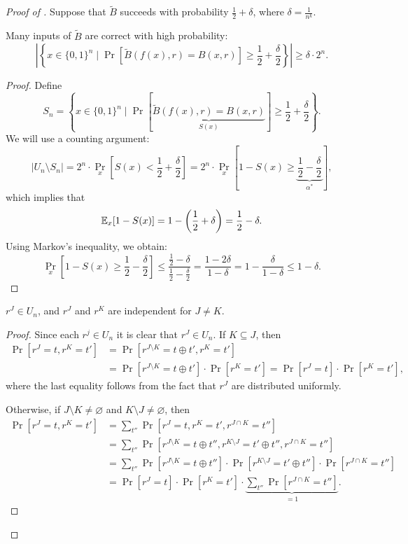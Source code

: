 \begin{proof}[Proof of ]
    Suppose that $\tilde{B}$ succeeds with probability $\frac{1}{2} + \delta$, where $\delta = \frac{1}{n^{k}}$.

	\begin{lemma}
		Many inputs of $\tilde{B}$ are correct with high probability:
		 \[
			 \left|\left\{x \in \{0,1\}^n \mid \Pr[\tilde{B}(f(x), r) = B(x, r)] \geq \frac{1}{2} + \frac{\delta}{2}\right\}\right| \geq \delta \cdot 2^n.
		\] 
	\end{lemma}

	\begin{proof}
		  Define 
		  \[
			  S_n = \left\{x \in \{0,1\}^n \mid \Pr\left[\underbrace{\tilde{B}(f(x), r) = B(x, r)}_{S(x)}\right] \geq \frac{1}{2} + \frac{\delta}{2}\right\}.
		  \] 
		  We will use a counting argument:
		\[
			|U_n \setminus S_n| = 2^{n} \cdot \Pr_x \left[S(x) < \frac{1}{2} + \frac{\delta}{2}\right] = 2^{n} \cdot \Pr_x \left[1 - S(x) \geq \underbrace{\frac{1}{2} - \frac{\delta}{2}}_{\alpha^*}\right],
		\] 
		which implies that
		\[
			\mathbb{E}_x[1 - S(x)] = 1 - \left(\frac{1}{2} + \delta\right) = \frac{1}{2} - \delta.
		\] 
		Using Markov's inequality, we obtain:
		\[
			\Pr_x \left[1 - S(x) \geq \frac{1}{2} - \frac{\delta}{2}\right] \leq \frac{\frac{1}{2} - \delta}{\frac{1}{2} - \frac{\delta}{2}} = \frac{1 - 2 \delta}{1 - \delta} = 1 - \frac{\delta}{1 - \delta} \leq 1 - \delta.
		\] 
	\end{proof}

	\begin{lemma}
		$r^J \in U_n$, and $r^J$ and $r^K$ are independent for $J \neq K$.
	\end{lemma}

	\begin{proof}
		Since each $r^{j} \in  U_n$ it is clear that $r^{J} \in  U_n$.
		If $K \subseteq J$, then
		 \begin{align*}
			 \Pr[r^J = t, r^K = t'] &= \Pr[r^{J \setminus K} = t \oplus t', r^{K} = t'] \\
									&= \Pr[r^{J \setminus K} = t \oplus t'] \cdot \Pr[r^K = t'] = \Pr[r^J = t] \cdot \Pr[r^K = t'],
		 \end{align*} 
		 where the last equality follows from the fact that $r^J$ are distributed uniformly. 

		 Otherwise, if $J \setminus K \neq \varnothing$ and $K \setminus J \neq \varnothing$, then
		 \begin{align*}
			 \Pr[r^J = t, r^K = t'] &= \sum_{t''} \Pr[r^J = t, r^K = t', r^{J \cap K} = t''] \\
									&= \sum_{t''} \Pr[r^{J \setminus K} = t \oplus t'', r^{K \setminus J} = t' \oplus t'', r^{J \cap K} = t''] \\
									&= \sum_{t''} \Pr[r^{J \setminus K} = t \oplus t''] \cdot \Pr[r^{K \setminus J} = t' \oplus t''] \cdot \Pr[r^{J \cap K} = t''] \\
									&= \Pr[r^{J} = t] \cdot \Pr[r^{K} = t'] \cdot \underbrace{\sum_{t''} \Pr[r^{J \cap K} = t'']}_{=1}.
		 \end{align*}
	\end{proof}


\end{proof}
